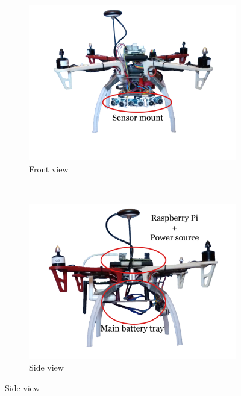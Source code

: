 \begin{figure}[htbp]
	\centering

	\begin{subfigure}[b]{0.45\textwidth}
		\includegraphics[width=\textwidth]{./figures/f450/front.png}
		\caption{Front view}
	\end{subfigure}
	~
	\begin{subfigure}[b]{0.45\textwidth}
		\includegraphics[width=\textwidth]{./figures/f450/side.png}
		\caption{Side view}
	\end{subfigure}


\end{figure}
